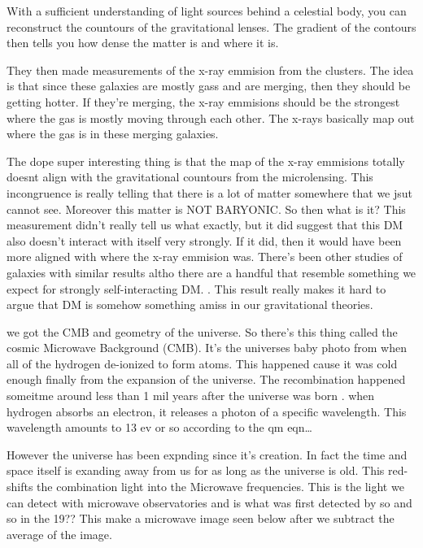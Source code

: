 
With a sufficient understanding of light sources behind a celestial body, you can reconstruct the countours of the gravitational lenses.
The gradient of the contours then tells you how dense the matter is and where it is.

They then made measurements of the x-ray emmision from the clusters.
The idea is that since these galaxies are mostly gass and are merging, then they should be getting hotter.
If they're merging, the x-ray emmisions should be the strongest where the gas is mostly moving through each other.
The x-rays basically map out where the gas is in these merging galaxies.


The dope super interesting thing is that the map of the x-ray emmisions totally doesnt align with the gravitational countours from the microlensing.
This incongruence is really telling that there is a lot of matter somewhere that we jsut cannot see.
Moreover this matter is NOT BARYONIC.
So then what is it?
This measurement didn't really tell us what exactly, but it did suggest that this DM also doesn't interact with itself very strongly.
If it did, then it would have been more aligned with where the x-ray emmision was.
There's been other studies of galaxies with similar results altho there are a handful that resemble something we expect for strongly self-interacting DM. \ns.
This result really makes it hard to argue that DM is somehow something amiss in our gravitational theories.

we got the CMB and geometry of the universe.
So there's this thing called the cosmic Microwave Background (CMB).
It's the universes baby photo from when all of the hydrogen de-ionized to form atoms.
This happened cause it was cold enough finally from the expansion of the universe.
The recombination happened someitme around less than 1 mil years after the universe was born \fu \ns.
when hydrogen absorbs an electron, it releases a photon of a specific wavelength.
This wavelength amounts to 13 ev or so according to the qm eqn\dots


However the universe has been expnding since it's creation.
In fact the time and space itself is exanding away from us for as long as the universe is old.
This red-shifts the combination light into the Microwave frequencies.
This is the light we can detect with microwave observatories and is what was first detected by so and so in the 19?? \ns \fu
This make a microwave image seen below after we subtract the average of the image.

